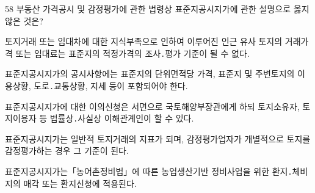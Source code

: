 \begin{question}{58}
부동산 가격공시 및 감정평가에 관한 법령상 표준지공시지가에 관한 설명으로 옳지 않은 것은?
\begin{choices}
  \item 토지거래 또는 임대차에 대한 지식부족으로 인하여 이루어진 인근 유사 토지의 거래가격 또는 임대료는 표준지의 적정가격의 조사․평가 기준이 될 수 없다.
  \item 표준지공시지가의 공시사항에는 표준지의 단위면적당 가격, 표준지 및 주변토지의 이용상황, 도로․교통상황, 지세 등이 포함되어야 한다.
  \item 표준지공시지가에 대한 이의신청은 서면으로 국토해양부장관에게 하되 토지소유자, 토지이용자 등 법률상․사실상 이해관계인이 할 수 있다.
  \item 표준지공시지가는 일반적 토지거래의 지표가 되며, 감정평가업자가 개별적으로 토지를 감정평가하는 경우 그 기준이 된다.
  \item 표준지공시지가는「농어촌정비법」에 따른 농업생산기반 정비사업을 위한 환지․체비지의 매각 또는 환지신청에 적용된다.
\end{choices}
\end{question}
